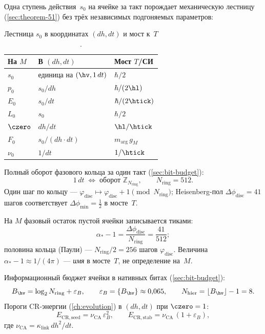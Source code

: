Одна ступень действия~$s_0$ на ячейке за такт порождает механическую лестницу
(\cref{sec:theorem-51}) без трёх независимых подгоняемых параметров:

\begin{table}[ht]
\centering
\caption{Лестница $s_0$ в координатах $(dh,dt)$ и мост к~$T$.}
\label{tab:dh-dt-bridge}
\begin{tabular}{@{}lll@{}}
\toprule
На $M$ & В $(dh,dt)$ & Мост $T$/СИ \\
\midrule
$s_0$ & единица на $(\hv,1\,dt)$ & $\hbar/2$ \\
$p_0$ & $s_0/dh$ & $\hbar/(2\hl)$ \\
$E_0$ & $s_0/dt$ & $\hbar/(2\htick)$ \\
$L_0$ & $s_0$ & $\hbar/2$ \\
$\czero$ & $dh/dt$ & $\hl/\htick$ \\
$F_0$ & $s_0/(dh\cdot dt)$ & $m_{\mathrm{arg}}\,g_M$ \\
$\nu_0$ & $1/dt$ & $1/\htick$ \\
\bottomrule
\end{tabular}
\end{table}

Полный оборот фазового кольца за один такт (\cref{sec:bit-budget}):
\[
  1\,dt \;\Longleftrightarrow\; \text{оборот }\mathbb{Z}_{N_{\mathrm{ring}}},
  \qquad
  N_{\mathrm{ring}}=512.
\]
Один шаг по кольцу --- $\varphi_{\mathrm{disc}}\mapsto\varphi_{\mathrm{disc}}+1\pmod{N_{\mathrm{ring}}}$;
Heisenberg-пол $\Delta\phi_{\mathrm{disc}}=41$ шагов соответствует
$\Delta\phi_{\min}=\tfrac12$ в мосте~$T$.

\begin{remark}
На $M$ фазовый остаток пустой ячейки записывается тиками:
\[
  \alpha_*-1=\frac{\Delta\phi_{\mathrm{disc}}}{N_{\mathrm{ring}}}
  =\frac{41}{512};
\]
половина кольца (Паули) --- $N_{\mathrm{ring}}/2=256$ шагов $\varphi_{\mathrm{disc}}$.
Величина $\alpha_*-1\approx 1/(4\pi)$ --- \emph{имя} в мосте~$T$, не определение на~$M$.
\end{remark}

Информационный бюджет ячейки в нативных битах (\cref{sec:bit-budget}):
\[
  B_{\hv}=\log_2 N_{\mathrm{ring}}+\varepsilon_B,
  \qquad
  \varepsilon_B=\{B_{\hv}\}\approx 0{,}065,
  \qquad
  N_{\mathrm{hier}}=\lfloor B_{\hv}\rfloor-1=8.
\]
Пороги CR-энергии (\cref{ch:evolution}) в $(dh,dt)$ при $\czero=1$:
\[
  E_{\mathrm{CR,seed}}=\nu_{\mathrm{CA}}\,\varepsilon_B^2,
  \qquad
  E_{\mathrm{CR,stab}}=\nu_{\mathrm{CA}}\,(1+\varepsilon_B),
\]
где $\nu_{\mathrm{CA}}=\kappa_{\mathrm{link}}\,dh^2/dt$.

